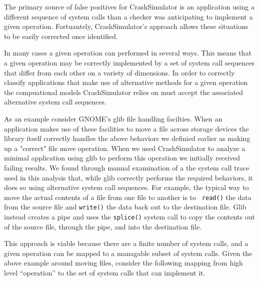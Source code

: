 The primary source of false positives for CrashSimulator is an application using a different sequence of system
calls than a checker was anticipating to implement a given operation.  Fortuantely, CrashSimulator's approach allows
these situations to be easily corrected once identified.

In many cases a given operation can performed in several ways.  This means that a given operation may be correctly
implemented by a set of system call sequences that differ from each other on a variety of dimensions.  In order to
correctly classify applications that make use of alternative methods for a given operation the compuational models
CrashSimulator relies on must accept the associated alternative system call sequences.

As an example consider GNOME's glib file handling facilties.  When an application makes use of these facilities to move
a file across storage devices the library itself correctly handles the above behaviors we definied earlier as making up
a "correct" file move operation.  When we used CrashSimulator to analyze a minimal application using glib to perform
this operation we initially received failing results.  We found through manual examination of a the system call trace
used in this analysis that, while glib correctly performs the required behaviors, it does so using alternative system
call sequences.  For example, the typical way to move the actual contents of a file from one file to another is to {\tt
read()} the data from the source file and {\tt write()} the data back out to the destination file.  Glib instead
creates a pipe and uses the {\tt splice()} system call to copy the contents out of the source file, through the pipe,
and into the destination file.

This approach is viable because there are a finite number of system calls, and a given operation can be mapped to a
managable subset of system calls.  Given the above example around moving files, consider the following mapping from
high level ``operation'' to the set of system calls that can implement it.

